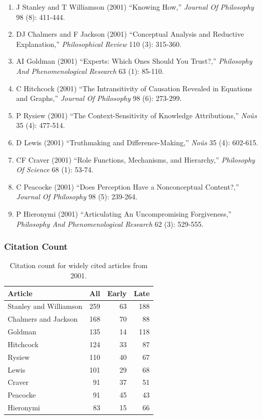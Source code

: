 \documentclass[
  10pt,
  letterpaper,
  DIV=11,
  numbers=noendperiod,
  twoside]{scrartcl}
\providecommand{\tightlist}{%
  \setlength{\itemsep}{0pt}\setlength{\parskip}{0pt}}\usepackage{longtable,booktabs,array}
\begin{document}
\begin{enumerate}
\def\labelenumi{\arabic{enumi}.}
\tightlist
\item
  J Stanley and T Williamson (2001) ``Knowing How,'' \emph{Journal Of
  Philosophy} 98 (8): 411-444.
\item
  DJ Chalmers and F Jackson (2001) ``Conceptual Analysis and Reductive
  Explanation,'' \emph{Philosophical Review} 110 (3): 315-360.
\item
  AI Goldman (2001) ``Experts: Which Ones Should You Trust?,''
  \emph{Philosophy And Phenomenological Research} 63 (1): 85-110.
\item
  C Hitchcock (2001) ``The Intransitivity of Causation Revealed in
  Equations and Graphs,'' \emph{Journal Of Philosophy} 98 (6): 273-299.
\item
  P Rysiew (2001) ``The Context-Sensitivity of Knowledge Attributions,''
  \emph{Noûs} 35 (4): 477-514.
\item
  D Lewis (2001) ``Truthmaking and Difference-Making,'' \emph{Noûs} 35
  (4): 602-615.
\item
  CF Craver (2001) ``Role Functions, Mechanisms, and Hierarchy,''
  \emph{Philosophy Of Science} 68 (1): 53-74.
\item
  C Peacocke (2001) ``Does Perception Have a Nonconceptual Content?,''
  \emph{Journal Of Philosophy} 98 (5): 239-264.
\item
  P Hieronymi (2001) ``Articulating An Uncompromising Forgiveness,''
  \emph{Philosophy And Phenomenological Research} 62 (3): 529-555.
\end{enumerate}

\subsubsection*{Citation Count}\label{sec-count-2001}

\begin{longtable}[]{@{}lrrr@{}}

\caption{\label{tbl-citation-count-2001}Citation count for widely cited
articles from 2001.}

\tabularnewline

\toprule\noalign{}
Article & All & Early & Late \\
\midrule\noalign{}
\endhead
\bottomrule\noalign{}
\endlastfoot
Stanley and Williamson & 259 & 63 & 188 \\
Chalmers and Jackson & 168 & 70 & 88 \\
Goldman & 135 & 14 & 118 \\
Hitchcock & 124 & 33 & 87 \\
Rysiew & 110 & 40 & 67 \\
Lewis & 101 & 29 & 68 \\
Craver & 91 & 37 & 51 \\
Peacocke & 91 & 45 & 43 \\
Hieronymi & 83 & 15 & 66 \\

\end{longtable}
\end{document}
